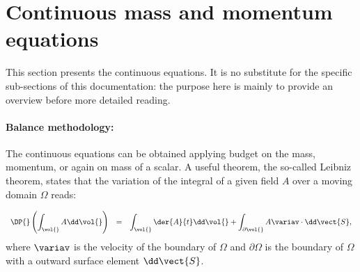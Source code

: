 
%
%
%
%


\section{Continuous mass and momentum equations}

This section presents the continuous equations. It is no substitute for the
specific sub-sections of this documentation: the purpose here is mainly to
provide an overview before more detailed reading.

\paragraph{Balance methodology:}
The continuous equations can be obtained applying budget on the mass,
momentum, or again on mass of a scalar. A useful theorem, the so-called
Leibniz theorem, states that the variation of the integral of a given field $A$ 
over a moving domain $\Omega$ reads:

 \begin{equation}\label{eq:goveq:leibnitz_th}
\begin{array}{r c l}
\displaystyle \DP{} \left( \int_{\vol{} } A \dd \vol{} \right) &=& 
\displaystyle \int_{\vol{} }\der{A}{t} \dd \vol{} + \int_{\partial \vol{}} A  \variav \cdot  \dd \vect{S},
\end{array}
 \end{equation}
 where $\variav$ is the velocity of the boundary of $\Omega$ and $\partial \Omega$ is the boundary of $\Omega$ with a outward surface element $\dd \vect{S}$. 

